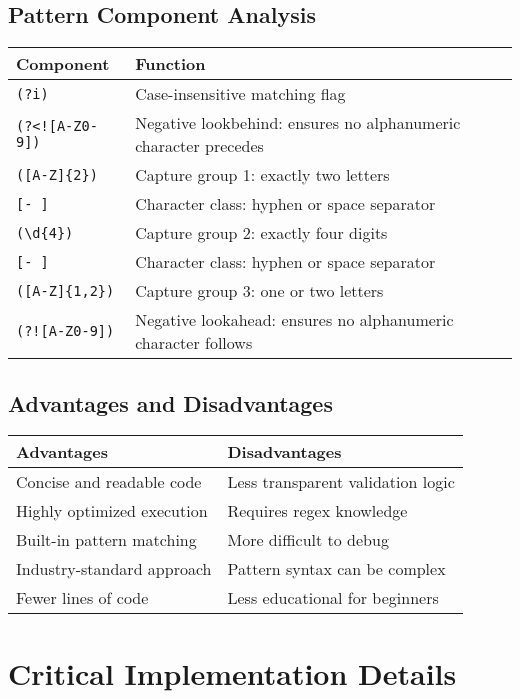 \documentclass[12pt,a4paper]{article}
\begin{document}
\subsection{Pattern Component Analysis}
\begin{center}
\begin{tabular}{|l|p{}|}
\hline
\textbf{Component} & \textbf{Function} \\
\hline
\texttt{(?i)} & Case-insensitive matching flag \\
\texttt{(?<![A-Z0-9])} & Negative lookbehind: ensures no alphanumeric character precedes \\
\texttt{([A-Z]\{2\})} & Capture group 1: exactly two letters \\
\texttt{[- ]} & Character class: hyphen or space separator \\
\texttt{(\textbackslash{}d\{4\})} & Capture group 2: exactly four digits \\
\texttt{[- ]} & Character class: hyphen or space separator \\
\texttt{([A-Z]\{1,2\})} & Capture group 3: one or two letters \\
\texttt{(?![A-Z0-9])} & Negative lookahead: ensures no alphanumeric character follows \\
\hline
\end{tabular}
\end{center}

\subsection{Advantages and Disadvantages}
\begin{center}
\begin{tabular}{|p{}|p{}|}
\hline
\textbf{Advantages} & \textbf{Disadvantages} \\
\hline
Concise and readable code & Less transparent validation logic \\
Highly optimized execution & Requires regex knowledge \\
Built-in pattern matching & More difficult to debug \\
Industry-standard approach & Pattern syntax can be complex \\
Fewer lines of code & Less educational for beginners \\
\hline
\end{tabular}
\end{center}

\section{Critical Implementation Details}
\end{document}
